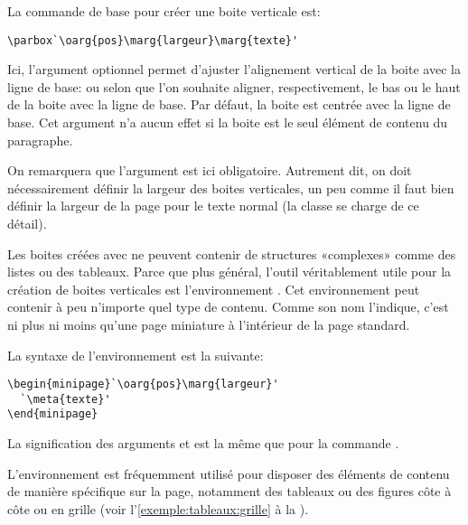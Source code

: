 La commande de base pour créer une boite verticale est:
\begin{lstlisting}
\parbox`\oarg{pos}\marg{largeur}\marg{texte}'
\end{lstlisting}
Ici, l'argument optionnel  permet d'ajuster l'alignement
vertical de la boite avec la ligne de base:  ou  selon
que l'on souhaite aligner, respectivement, le bas ou le haut de la
boite avec la ligne de base. Par défaut, la boite est centrée avec la
ligne de base. Cet argument n'a aucun effet si la boite est le seul
élément de contenu du paragraphe.

On remarquera que l'argument  est ici obligatoire.
Autrement dit, on doit nécessairement définir la largeur des boites
verticales, un peu comme il faut bien définir la largeur de la page
pour le texte normal (la classe se charge de ce détail).

Les boites créées avec \cmd{\parbox} ne peuvent contenir de structures
«complexes» comme des listes ou des tableaux. Parce que plus général,
l'outil véritablement utile pour la création de boites verticales est
l'environnement . Cet environnement peut contenir à peu
n'importe quel type de contenu. Comme son nom l'indique, c'est ni plus
ni moins qu'une page miniature à l'intérieur de la page standard.

La syntaxe de l'environnement  est la suivante:
\begin{lstlisting}
\begin{minipage}`\oarg{pos}\marg{largeur}'
  `\meta{texte}'
\end{minipage}
\end{lstlisting}
La signification des arguments  et  est la
même que pour la commande .

L'environnement  est fréquemment utilisé pour disposer
des éléments de contenu de manière spécifique sur la page, notamment
des tableaux ou des figures côte à côte ou en grille (voir
l'\autoref{exemple:tableaux:grille} à la
).

